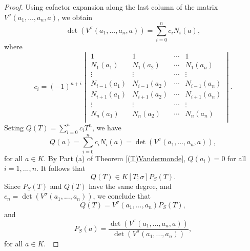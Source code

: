 \documentclass[10pt,a4paper]{amsart}
\newcommand{\s}{\sigma}
\begin{document}
	 \begin{proof}
	 	Using cofactor expansion along the last column of the matrix $V^\s(a_1,...,a_n,a)$, we obtain
	 	$$\det \left( V^\s(a_1,...,a_n,a)\right)=\sum_{i=0}^n c_i N_i(a),$$
	 	where $$c_i=(-1)^{n+i}\begin{vmatrix}
	 		1&1&\cdots&1\\
	 		N_{1}(a_1)&N_{1}(a_2)&\cdots&N_{1}(a_n)\\
	 		\vdots&\vdots&\cdots&\vdots\\
	 		N_{i-1}(a_1)&N_{i-1}(a_2)&\cdots&N_{i-1}(a_n)\\
	 		N_{i+1}(a_1)&N_{i+1}(a_2)&\cdots&N_{i+1}(a_n)\\
	 		\vdots&\vdots&\cdots&\vdots\\
	 		N_{n}(a_1)&N_{n}(a_2)&\cdots&N_{n}(a_n)\\
	 	\end{vmatrix}.$$  Seting $Q(T)=\sum_{i=0}^nc_i T^n$, we have
	 	$$Q(a)=\sum_{i=0}^nc_i N_i(a)=\det \left( V^\s(a_1,...,a_n,a)\right),$$
	 	for all $a\in K$. By Part (a) of Theorem \ref{(T)Vandermonde}, $Q(a_i)=0$ for all $i=1,...,n$. It follows that   
	 	$$Q(T)\in K[T;\s]P_S(T).$$
	 	Since $P_S(T)$ and $Q(T)$ have the same degree, and $c_n=\det (V^\s(a_1,...,a_n))$, we conclude that
	 	$$Q(T)=V^\s(a_1,...,a_n)P_S(T),$$
	 and
	 $$P_S(a)=\frac{ \det \left( V^\s(a_1,...,a_n,a)\right)  }{\det \left( V^\s(a_1,...,a_n)\right) },$$
	 for all $a\in K$.\
	 

\end{proof}
\end{document}
